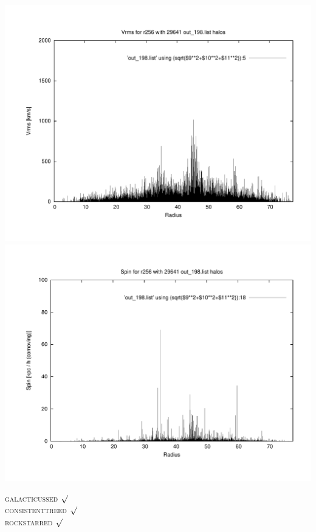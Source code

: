 \includegraphics[scale=0.3]{r256/h100/stages_51/plot_Vrms_out_198.pdf}
\includegraphics[scale=0.3]{r256/h100/stages_51/plot_spin_out_198.pdf}

\textsc{galacticussed} $\surd$ \\
\textsc{consistenttreed} $\surd$ \\ 
\textsc{rockstarred} $\surd$


% 
%
%
%
%
%
%
%


\newpage
